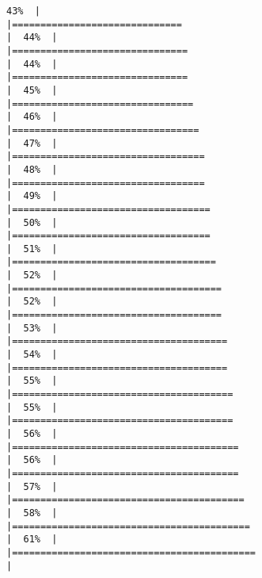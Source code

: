 \documentclass[
]{article}
\begin{document}
\begin{verbatim}
43%  |                                                                              |==============================                                        |  44%  |                                                                              |===============================                                       |  44%  |                                                                              |===============================                                       |  45%  |                                                                              |================================                                      |  46%  |                                                                              |=================================                                     |  47%  |                                                                              |==================================                                    |  48%  |                                                                              |==================================                                    |  49%  |                                                                              |===================================                                   |  50%  |                                                                              |===================================                                   |  51%  |                                                                              |====================================                                  |  52%  |                                                                              |=====================================                                 |  52%  |                                                                              |=====================================                                 |  53%  |                                                                              |======================================                                |  54%  |                                                                              |======================================                                |  55%  |                                                                              |=======================================                               |  55%  |                                                                              |=======================================                               |  56%  |                                                                              |========================================                              |  56%  |                                                                              |========================================                              |  57%  |                                                                              |=========================================                             |  58%  |                                                                              |==========================================                            |  61%  |                                                                              |===========================================                           |  
\end{verbatim}
\end{document}
